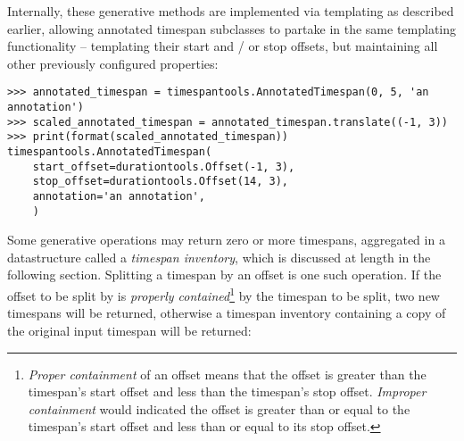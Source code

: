 \noindent Internally, these generative methods are implemented via templating
as described earlier, allowing annotated timespan subclasses to partake in the
same templating functionality -- templating their start and / or stop offsets,
but maintaining all other previously configured properties:

\begin{comment}
<abjad>
annotated_timespan = timespantools.AnnotatedTimespan(0, 5, 'an annotation')
scaled_annotated_timespan = annotated_timespan.translate((-1, 3))
print(format(scaled_annotated_timespan))
</abjad>
\end{comment}

\begin{singlespacing}
\vspace{-0.5\baselineskip}
\begin{lstlisting}
>>> annotated_timespan = timespantools.AnnotatedTimespan(0, 5, 'an annotation')
>>> scaled_annotated_timespan = annotated_timespan.translate((-1, 3))
>>> print(format(scaled_annotated_timespan))
timespantools.AnnotatedTimespan(
    start_offset=durationtools.Offset(-1, 3),
    stop_offset=durationtools.Offset(14, 3),
    annotation='an annotation',
    )
\end{lstlisting}
\end{singlespacing}

\noindent Some generative operations may return zero or more timespans,
aggregated in a datastructure called a \emph{timespan inventory}, which is
discussed at length in the following section. Splitting a timespan by an offset
is one such operation. If the offset to be split by is \emph{properly
contained}\footnote{\emph{Proper containment} of an offset means that the
offset is greater than the timespan's start offset and less than the timespan's
stop offset. \emph{Improper containment} would indicated the offset is greater
than or equal to the timespan's start offset and less than or equal to its stop
offset.} by the timespan to be split, two new timespans will be returned,
otherwise a timespan inventory containing a copy of the original input timespan
will be returned:

\begin{comment}
<abjad>
two_shards = timespan.split_at_offset(5)
print(format(two_shards))
one_shard = timespan.split_at_offset(10000)
print(format(one_shard))
</abjad>
\end{comment}

